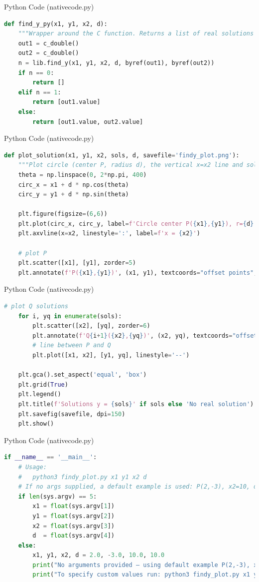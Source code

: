 \documentclass{beamer}
\begin{document}
\begin{frame}[fragile]{Python Code (nativecode.py)}
\begin{lstlisting}[language=Python]
def find_y_py(x1, y1, x2, d):
    """Wrapper around the C function. Returns a list of real solutions (possibly empty)."""
    out1 = c_double()
    out2 = c_double()
    n = lib.find_y(x1, y1, x2, d, byref(out1), byref(out2))
    if n == 0:
        return []
    elif n == 1:
        return [out1.value]
    else:
        return [out1.value, out2.value]

\end{lstlisting}
\end{frame}
\begin{frame}[fragile]{Python Code (nativecode.py)}
\begin{lstlisting}[language=Python]
def plot_solution(x1, y1, x2, sols, d, savefile='findy_plot.png'):
    """Plot circle (center P, radius d), the vertical x=x2 line and solution points."""
    theta = np.linspace(0, 2*np.pi, 400)
    circ_x = x1 + d * np.cos(theta)
    circ_y = y1 + d * np.sin(theta)

    plt.figure(figsize=(6,6))
    plt.plot(circ_x, circ_y, label=f'Circle center P({x1},{y1}), r={d}')
    plt.axvline(x=x2, linestyle=':', label=f'x = {x2}')

    # plot P
    plt.scatter([x1], [y1], zorder=5)
    plt.annotate(f'P({x1},{y1})', (x1, y1), textcoords="offset points", xytext=(6,6))
\end{lstlisting}
\end{frame}
\begin{frame}[fragile]{Python Code (nativecode.py)}
\begin{lstlisting}[language=Python]
    # plot Q solutions
    for i, yq in enumerate(sols):
        plt.scatter([x2], [yq], zorder=6)
        plt.annotate(f'Q{i+1}({x2},{yq})', (x2, yq), textcoords="offset points", xytext=(6,6))
        # line between P and Q
        plt.plot([x1, x2], [y1, yq], linestyle='--')

    plt.gca().set_aspect('equal', 'box')
    plt.grid(True)
    plt.legend()
    plt.title(f'Solutions y = {sols}' if sols else 'No real solution')
    plt.savefig(savefile, dpi=150)
    plt.show()
\end{lstlisting}
\end{frame}
\begin{frame}[fragile]{Python Code (nativecode.py)}
\begin{lstlisting}[language=Python]
if __name__ == '__main__':
    # Usage:
    #   python3 findy_plot.py x1 y1 x2 d
    # If no args supplied, a default example is used: P(2,-3), x2=10, d=10
    if len(sys.argv) == 5:
        x1 = float(sys.argv[1])
        y1 = float(sys.argv[2])
        x2 = float(sys.argv[3])
        d  = float(sys.argv[4])
    else:
        x1, y1, x2, d = 2.0, -3.0, 10.0, 10.0
        print("No arguments provided — using default example P(2,-3), x2=10, d=10.")
        print("To specify custom values run: python3 findy_plot.py x1 y1 x2 d")
\end{lstlisting}
\end{frame}
\end{document}
